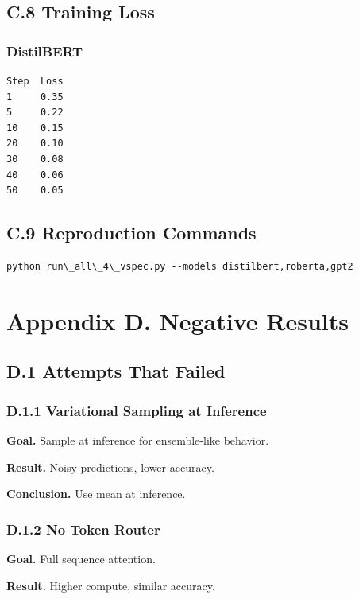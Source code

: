\subsection{C.8 Training Loss}

\subsubsection{DistilBERT}
\begin{lstlisting}
Step  Loss
1     0.35
5     0.22
10    0.15
20    0.10
30    0.08
40    0.06
50    0.05
\end{lstlisting}

\subsection{C.9 Reproduction Commands}

\begin{lstlisting}
python run\_all\_4\_vspec.py --models distilbert,roberta,gpt2
\end{lstlisting}



\section{Appendix D. Negative Results}

\subsection{D.1 Attempts That Failed}

\subsubsection{D.1.1 Variational Sampling at Inference}

\textbf{Goal.} Sample at inference for ensemble-like behavior.

\textbf{Result.} Noisy predictions, lower accuracy.

\textbf{Conclusion.} Use mean at inference.

\subsubsection{D.1.2 No Token Router}

\textbf{Goal.} Full sequence attention.

\textbf{Result.} Higher compute, similar accuracy.

